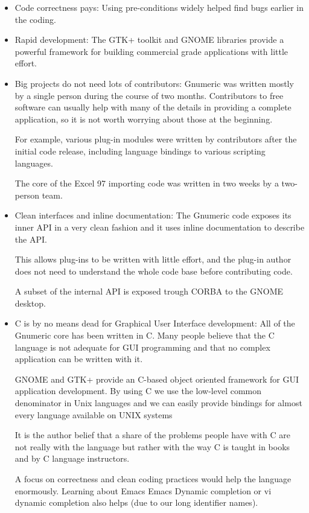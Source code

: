 \documentclass[12pt,twoside,twocolumn]{article}
\begin{document}
\begin{itemize}
	
	\item {Code correctness pays:} Using pre-conditions widely
	helped find bugs earlier in the coding.

	\item {Rapid development:} The GTK+ toolkit and GNOME
	libraries provide a powerful framework for building commercial
	grade applications with little effort. 

	\item {Big projects do not need lots of contributors:}
	Gnumeric was written mostly by a single person during the
	course of two months.  Contributors to free software can
	usually help with many of the details in providing a complete
	application, so it is not worth worrying about those at the
	beginning.  

	For example, various plug-in modules were written by
	contributors after the initial code release, including
	language bindings to various scripting languages.

	The core of the Excel 97 importing code was written in two
	weeks by a two-person team. 

	\item {Clean interfaces and inline documentation:} The
	Gnumeric code exposes its inner API in a very clean fashion
	and it uses inline documentation to describe the API.

	This allows plug-ins to be written with little effort, and the
	plug-in author does not need to understand the whole code base
	before contributing code.

	A subset of the internal API is exposed trough CORBA to the
	GNOME desktop.

	\item {C is by no means dead for Graphical User Interface
	development:} All of the Gnumeric core has been written in C.
	Many people believe that the C language is not adequate for
	GUI programming and that no complex application can be written
	with it.

	GNOME and GTK+ provide an C-based object oriented framework
	for GUI application development.  By using C we use the
	low-level common denominator in Unix languages and we can
	easily provide bindings for almost every language available on
	UNIX systems \cite{gnome2}

	It is the author belief that a share of the problems people
	have with C are not really with the language but rather with
	the way C is taught in books and by C language instructors.  

	A focus on correctness and clean coding practices would help
	the language enormously.  Learning about Emacs Emacs Dynamic
	completion or vi dynamic completion also helps (due to our
	long identifier names).
	
\end{itemize}
\end{document}
